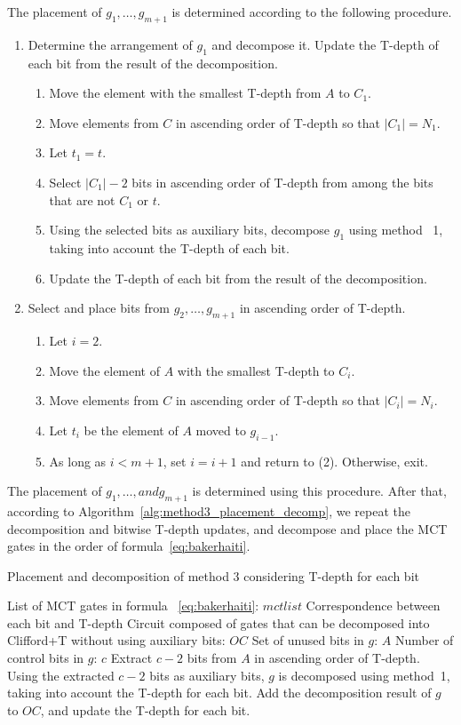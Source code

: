 The placement of $g_{1},\dots,g_{m+1}$ is determined according to the following procedure.
\begin{enumerate}[Step 1]
\item Determine the arrangement of $g_{1}$ and decompose it. Update the T-depth of each bit from the result of the decomposition.
\begin{enumerate}
\item Move the element with the smallest T-depth from $A$ to $C_{1}$.
\item Move elements from $C$ in ascending order of T-depth so that $|C_{1}|=N_{1}$.
\item Let $t_{1}=t$.
\item Select $|C_{1}|-2$ bits in ascending order of T-depth from among the bits that are not $C_{1}$ or $t$.
\item Using the selected bits as auxiliary bits, decompose $g_{1}$ using method ~1, taking into account the T-depth of each bit.
\item Update the T-depth of each bit from the result of the decomposition.
\end{enumerate}
\item Select and place bits from $g_{2}, \dots ,g_{m+1}$ in ascending order of T-depth.
\begin{enumerate}[(1)]
\item Let $i=2$.
\item Move the element of $A$ with the smallest T-depth to $C_{i}$.
\item Move elements from $C$ in ascending order of T-depth so that $|C_{i}|=N_{i}$.
\item Let $t_{i}$ be the element of $A$ moved to $g_{i-1}$.
\item As long as $i < m+1$, set $i=i+1$ and return to (2). Otherwise, exit.
\end{enumerate}
\end{enumerate}
The placement of $g_{1},\dots, and g_{m+1}$ is determined using this procedure.
After that,
according to Algorithm~\ref{alg:method3_placement_decomp},
we repeat the decomposition and bitwise T-depth updates,
and decompose and place the MCT gates in the order of formula~\ref{eq:bakerhaiti}.
\begin{algorithm}[tbp]
\caption{Placement and decomposition of method 3 considering T-depth for each bit}
\label{alg:method3_placement_decomp}
\begin{algorithmic}[1]
\Require List of MCT gates in formula ~\ref{eq:bakerhaiti}: $mctlist$
\Require Correspondence between each bit and T-depth
\Ensure Circuit composed of gates that can be decomposed into Clifford+T without using auxiliary bits: $OC$
\State Set of unused bits in \State $g$: $A$
\State Number of control bits in \State $g$: $c$
\State Extract $c-2$ bits from \State $A$ in ascending order of T-depth.
\State Using the extracted $c-2$ bits as auxiliary bits, $g$ is decomposed using method~1, taking into account the T-depth for each bit.
\State Add the decomposition result of $g$ to $OC$, and update the T-depth for each bit.
\EndFor
\end{algorithmic}
\end{algorithm}
